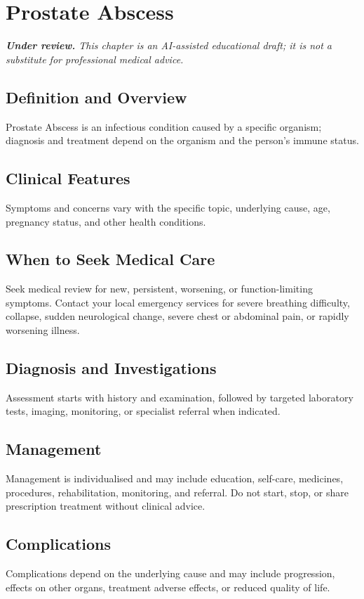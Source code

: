 \chapter{Prostate Abscess}

\medskip
\noindent\textit{\textbf{Under review.} This chapter is an AI-assisted educational draft; it is not a substitute for professional medical advice.}

\section*{Definition and Overview}
Prostate Abscess is an infectious condition caused by a specific organism; diagnosis and treatment depend on the organism and the person's immune status.

\section*{Clinical Features}
Symptoms and concerns vary with the specific topic, underlying cause, age, pregnancy status, and other health conditions.

\section*{When to Seek Medical Care}
Seek medical review for new, persistent, worsening, or function-limiting symptoms. Contact your local emergency services for severe breathing difficulty, collapse, sudden neurological change, severe chest or abdominal pain, or rapidly worsening illness.

\section*{Diagnosis and Investigations}
Assessment starts with history and examination, followed by targeted laboratory tests, imaging, monitoring, or specialist referral when indicated.

\section*{Management}
Management is individualised and may include education, self-care, medicines, procedures, rehabilitation, monitoring, and referral. Do not start, stop, or share prescription treatment without clinical advice.

\section*{Complications}
Complications depend on the underlying cause and may include progression, effects on other organs, treatment adverse effects, or reduced quality of life.

